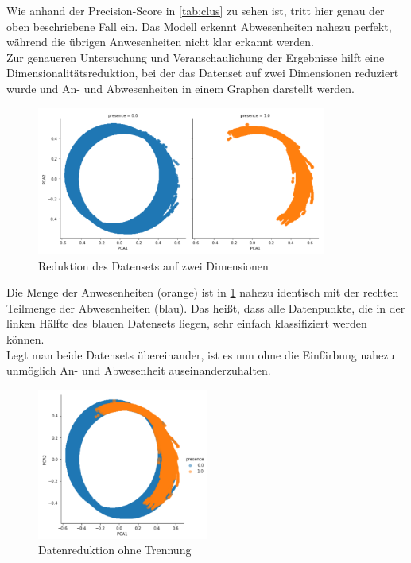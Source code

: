 Wie anhand der Precision-Score in \ref{tab:clus} zu sehen ist, tritt hier genau der oben beschriebene Fall ein.
Das Modell erkennt Abwesenheiten nahezu perfekt, während die übrigen Anwesenheiten nicht klar erkannt werden.\\
\newpage
Zur genaueren Untersuchung und Veranschaulichung der Ergebnisse hilft eine Dimensionalitätsreduktion, 
bei der das Datenset auf zwei Dimensionen reduziert wurde und An- und Abwesenheiten in einem Graphen darstellt werden.

\begin{figure}[h]
    \centering
    \includegraphics[width=0.85\textwidth]{pic/pca.png}
    \caption{Reduktion des Datensets auf zwei Dimensionen}
    \label{fig:pca}
\end{figure}

Die Menge der Anwesenheiten (orange) ist in \ref{fig:pca} nahezu identisch mit der rechten Teilmenge der 
Abwesenheiten (blau). 
Das heißt, dass alle Datenpunkte, die in der linken Hälfte des blauen Datensets liegen, sehr einfach klassifiziert 
werden können.\\
Legt man beide Datensets übereinander, ist es nun ohne die Einfärbung nahezu unmöglich An- und 
Abwesenheit auseinanderzuhalten.\\

\begin{figure}[h]
    \centering
    \includegraphics[width=0.5\textwidth]{pic/pca1.png}
    \caption{Datenreduktion ohne Trennung}
    \label{fig:pca1}
\end{figure}

